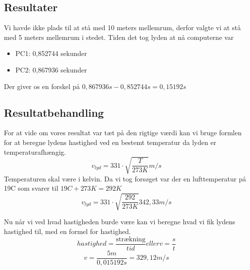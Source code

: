 \subsection{Resultater}
Vi havde ikke plads til at stå med 10 meters mellemrum, derfor valgte vi at stå med 5 meters mellemrum i stedet.\newline
Tiden det tog lyden at nå computerne var
\begin{itemize}
    \item PC1: 0,852744 sekunder
    \item PC2: 0,867936 sekunder
\end{itemize}
Der giver os en forskel på \begin{math}0,867936s - 0,852744s = 0,15192s\end{math}

\subsection{Resultatbehandling}
For at vide om vores resultat var tæt på den rigtige værdi kan vi bruge formlen for at beregne lydens hastighed ved en bestemt temperatur da lyden er temperaturafhængig.
\begin{equation*}
    v_{lyd} = 331 \cdot \sqrt{\frac{T}{273 K}}  m/s
\end{equation*}
Temperaturen skal være i kelvin. Da vi tog forsøget var der en lufttemperatur på 19C som svarer til \begin{math}19C + 273K = 292K\end{math}
\begin{equation*}
    v_{lyd} = 331 \cdot \sqrt{\frac{292}{273 K}} 342,33 m/s
\end{equation*}

Nu når vi ved hvad hastigheden burde være kan vi beregne hvad vi fik lydens hastighed til, med en formel for hastighed.
\begin{equation*}
    hastighed = \frac{\text{strækning}}{tid} eller v = \frac{s}{t}
\end{equation*}
\begin{equation*}
    v = \frac{5m}{0,015192s} = 329,12 m/s
\end{equation*}